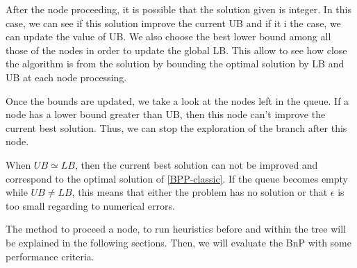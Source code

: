 After the node proceeding, it is possible that the solution given is integer. In this case, we can see if this solution improve the current UB and if it i the case, we can update the value of UB. We also choose the best lower bound among all those of the nodes in order to update the global LB. This allow to see how close the algorithm is from the solution by bounding the optimal solution by LB and UB at each node processing.

Once the bounds are updated, we take a look at the nodes left in the queue. If a node has a lower bound greater than UB, then this node can't improve the current best solution. Thus, we can stop the exploration of the branch after this node.

When $UB \simeq LB$, then the current best solution can not be improved and correspond to the optimal solution of \eqref{BPP-classic}. If the queue becomes empty while $UB \neq LB$, this means that either the problem has no solution or that $\epsilon$ is too small regarding to numerical errors.

The method to proceed a node, to run heuristics before and within the tree will be explained in the following sections. Then, we will evaluate the BnP with some performance criteria.